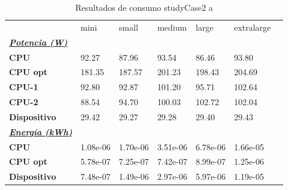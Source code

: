 \begin{table}[H]
    \centering
    \begin{tabular}{lllllll}
    \rowcolor[HTML]{DAE8FC} \ & mini & small & medium & 	large & 	extralarge \\
    \cellcolor[HTML]{DAE8FC} \textbf{\textbf{{\emph{{\underline{{Potencia (W)}}}}}}} &  &  &  & 	 & 	 \\
    \rowcolor[HTML]{EFEFEF} \cellcolor[HTML]{DAE8FC} \textbf{CPU} & 92.27 & 87.96 & 93.54 & 	86.46 & 	93.80 \\
    \cellcolor[HTML]{DAE8FC} \textbf{CPU opt} & 181.35 & 187.57 & 201.23 & 	198.43 & 	204.69 \\
    \rowcolor[HTML]{EFEFEF} \cellcolor[HTML]{DAE8FC} \textbf{\quad CPU-1} & 92.80 & 92.87 & 101.20 & 	95.71 & 	102.64 \\
    \cellcolor[HTML]{DAE8FC} \textbf{\quad CPU-2} & 88.54 & 94.70 & 100.03 & 	102.72 & 	102.04 \\
    \rowcolor[HTML]{EFEFEF} \cellcolor[HTML]{DAE8FC} \textbf{Dispositivo} & 29.42 & 29.27 & 29.28 & 	29.40 & 	29.43 \\
    \cellcolor[HTML]{DAE8FC} \textbf{\textbf{{\emph{{\underline{{Energía (kWh)}}}}}}} &  &  &  & 	 & 	 \\
    \rowcolor[HTML]{EFEFEF} \cellcolor[HTML]{DAE8FC} \textbf{CPU} & 1.08e-06 & 1.70e-06 & 3.51e-06 & 	6.78e-06 & 	1.66e-05 \\
    \cellcolor[HTML]{DAE8FC} \textbf{CPU opt} & 5.78e-07 & 7.25e-07 & 7.42e-07 & 	8.99e-07 & 	1.25e-06 \\
    \rowcolor[HTML]{EFEFEF} \cellcolor[HTML]{DAE8FC} \textbf{Dispositivo} & 7.48e-07 & 1.49e-06 & 2.97e-06 & 	5.97e-06 & 	1.19e-05 \\
    \end{tabular}
    \caption[Resultados de consumo studyCase2 a]{{Resultados de consumo studyCase2 a}}
    \label{table_test_studyCase2_a_hw_powerResults}
\end{table}